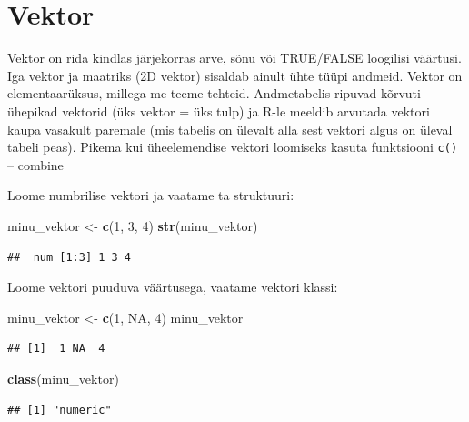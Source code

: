\documentclass[]{book}
\newenvironment{Shaded}{\begin{snugshade}}{\end{snugshade}}
\newcommand{\KeywordTok}[1]{\textcolor[rgb]{0.13,0.29,0.53}{\textbf{#1}}}
\newcommand{\DecValTok}[1]{\textcolor[rgb]{0.00,0.00,0.81}{#1}}
\newcommand{\StringTok}[1]{\textcolor[rgb]{0.31,0.60,0.02}{#1}}
\newcommand{\OtherTok}[1]{\textcolor[rgb]{0.56,0.35,0.01}{#1}}
\newcommand{\NormalTok}[1]{#1}
\begin{document}
\section{Vektor}\label{vektor}

Vektor on rida kindlas järjekorras arve, sõnu või TRUE/FALSE loogilisi
väärtusi. Iga vektor ja maatriks (2D vektor) sisaldab ainult ühte tüüpi
andmeid. Vektor on elementaarüksus, millega me teeme tehteid.
Andmetabelis ripuvad kõrvuti ühepikad vektorid (üks vektor = üks tulp)
ja R-le meeldib arvutada vektori kaupa vasakult paremale (mis tabelis on
ülevalt alla sest vektori algus on üleval tabeli peas). Pikema kui
üheelemendise vektori loomiseks kasuta funktsiooni \texttt{c()} --
combine

Loome numbrilise vektori ja vaatame ta struktuuri:

\begin{Shaded}
\begin{Highlighting}[]
\NormalTok{minu_vektor <-}\StringTok{ }\KeywordTok{c}\NormalTok{(}\DecValTok{1}\NormalTok{, }\DecValTok{3}\NormalTok{, }\DecValTok{4}\NormalTok{)}
\KeywordTok{str}\NormalTok{(minu_vektor)}
\end{Highlighting}
\end{Shaded}

\begin{verbatim}
##  num [1:3] 1 3 4
\end{verbatim}

Loome vektori puuduva väärtusega, vaatame vektori klassi:

\begin{Shaded}
\begin{Highlighting}[]
\NormalTok{minu_vektor <-}\StringTok{ }\KeywordTok{c}\NormalTok{(}\DecValTok{1}\NormalTok{, }\OtherTok{NA}\NormalTok{, }\DecValTok{4}\NormalTok{)}
\NormalTok{minu_vektor}
\end{Highlighting}
\end{Shaded}

\begin{verbatim}
## [1]  1 NA  4
\end{verbatim}

\begin{Shaded}
\begin{Highlighting}[]
\KeywordTok{class}\NormalTok{(minu_vektor)}
\end{Highlighting}
\end{Shaded}

\begin{verbatim}
## [1] "numeric"
\end{verbatim}
\end{document}
